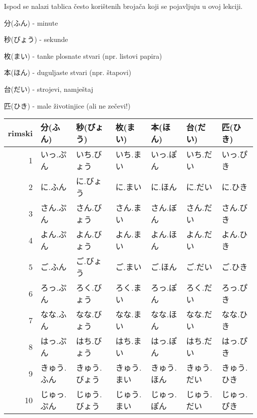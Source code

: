 	
	Ispod se nalazi tablica često korištenih brojača koji se pojavljuju u ovoj lekciji.
	
	\begin{hyou}
		\item 分(ふん) - minute
		\item 秒(びょう) - sekunde
		\item 枚(まい) - tanke plosnate stvari (npr. listovi papira)
		\item 本(ほん) - duguljaste stvari (npr. štapovi)
		\item 台(だい) - strojevi, namještaj
		\item 匹(ひき) - male životinjice (ali ne zečevi!)
	\end{hyou}

	\vspace{-20pt}
	\begin{table}[h]
		\centering
		\begin{tabular}{r l l l l l l}\toprule[2pt]
			rimski & 分(ふん) & 秒(びょう) & 枚(まい) & 本(ほん) & 台(だい) & 匹(ひき) \\
			\midrule
			1	& \colorbox{blue!10}{いっ.ぷん} & いち.びょう & いち.まい & \colorbox{blue!10}{いっ.ぽん} & いち.だい & \colorbox{blue!10}{いっ.ぴき} \\
			2	& に.ふん & に.びょう & に.まい & に.ほん & に.だい & に.ひき \\
			3	& \colorbox{blue!10}{さん.ぷん} & さん.びょう & さん.まい & \colorbox{blue!10}{さん.ぼん} & さん.だい & \colorbox{blue!10}{さん.びき} \\
			4	& \colorbox{blue!10}{よん.ぷん} & よん.びょう & よん.まい & よん.ほん & よん.だい & よん.ひき \\
			5	& ご.ふん & ご.びょう & ご.まい & ご.ほん & ご.だい & ご.ひき \\
			6	& \colorbox{blue!10}{ろっ.ぷん} & ろく.びょう & ろく.まい & \colorbox{blue!10}{ろっ.ぽん} & ろく.だい & \colorbox{blue!10}{ろっ.ぴき} \\
			7	& なな.ふん & なな.びょう & なな.まい & なな.ほん & なな.だい & なな.ひき \\
			8	& \colorbox{blue!10}{はっ.ぷん} & はち.びょう & はち.まい & \colorbox{blue!10}{はっ.ぽん} & はち.だい & \colorbox{blue!10}{はっ.ぴき} \\
			9	& きゅう.ふん & きゅう.びょう & きゅう.まい & きゅう.ほん & きゅう.だい & きゅう.ひき \\
			10	& \colorbox{blue!10}{じゅっ.ぷん} & じゅう.びょう & じゅう.まい & \colorbox{blue!10}{じゅっ.ぽん} & じゅう.だい & \colorbox{blue!10}{じゅっ.ぴき} \\
			\bottomrule
		\end{tabular}
	\end{table}
	
